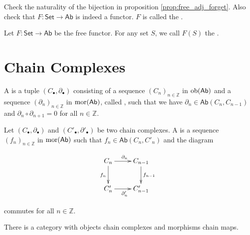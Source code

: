 \begin{exercise}
	Check the naturality of the bijection in proposition \ref{prop:free_adj_forget}. Also check that $F : \mathsf{Set} \to \mathsf{Ab}$ is indeed a functor. $F$ is called the .	
\end{exercise}

\begin{definition}
	Let $F : \mathsf{Set} \to \mathsf{Ab}$ be the free functor. For any set $S$, we call $F(S)$ the .
\end{definition}

\section*{Chain Complexes}

\begin{definition}
	A  is a tuple $(C_\bullet,\partial_\bullet)$ consisting of a sequence $(C_n)_{n \in \mathbb{Z}}$ in $\operatorname{ob}(\mathsf{Ab})$ and a sequence $(\partial_n)_{n \in \mathbb{Z}}$ in $\operatorname{mor}(\mathsf{Ab})$, called , such that we have $\partial_{n} \in \mathsf{Ab}(C_n,C_{n - 1})$ and $\partial_n \circ \partial_{n + 1} = 0$ for all $n \in \mathbb{Z}$.
\end{definition}

\begin{definition}
	Let $(C_\bullet,\partial_\bullet)$ and $(C'_\bullet,\partial'_\bullet)$ be two chain complexes. A  is a sequence $(f_n)_{n \in \mathbb{Z}}$ in $\operatorname{mor}(\mathsf{Ab})$ such that $f_n \in \mathsf{Ab}(C_n,C'_n)$ and the diagram
	\begin{center}
		\begin{displaymath}
			\xymatrix{ C_n \ar[r]^{\partial_n}\ar[d]_{f_n} & C_{n - 1} \ar[d]^{f_{n - 1}} \\
			C'_n \ar[r]_{\partial'_n} & C'_{n - 1}}
		\end{displaymath}
	\end{center}
	\noindent commutes for all $n \in \mathbb{Z}$.
\end{definition}

\begin{proposition}
	There is a category with objects chain complexes and morphisms chain maps.
	\label{prop:comp}
\end{proposition}

